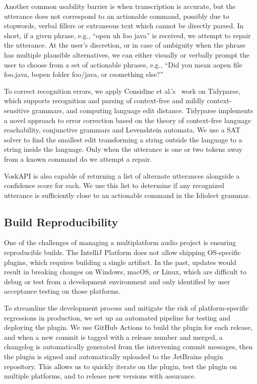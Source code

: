\documentclass[conference]{IEEEtran}
\begin{document}
Another common usability barrier is when transcription is accurate, but the utterance does not correspond to an actionable command, possibly due to stopwords, verbal fillers or extraneous text which cannot be directly parsed. In short, if a given phrase, e.g., ``open uh foo java'' is received, we attempt to repair the utterance. At the user's discretion, or in case of ambiguity when the phrase has multiple plausible alternatives, we can either visually or verbally prompt the user to choose from a set of actionable phrases, e.g., ``Did you mean \textlangle a\textrangle open file foo.java, \textlangle b\textrangle open folder foo/java, or \textlangle c\textrangle something else?''

To correct recognition errors, we apply Considine et al.'s~\cite{considine2022tidyparse} work on Tidyparse, which supports recognition and parsing of context-free and mildly context-sensitive grammars, and computing language edit distance. Tidyparse implements a novel approach to error correction based on the theory of context-free language reachability, conjunctive grammars and Levenshtein automata. We use a SAT solver to find the smallest edit transforming a string outside the language to a string inside the language. Only when the utterance is one or two tokens away from a known command do we attempt a repair.

VoskAPI is also capable of returning a list of alternate utterances alongside a confidence score for each. We use this list to determine if any recognized utterance is sufficiently close to an actionable command in the Idiolect grammar.

\subsection{Build Reproducibility}

One of the challenges of managing a multiplatform audio project is ensuring reproducible builds. The IntelliJ Platform does not allow shipping OS-specific plugins, which requires building a single artifact. In the past, updates would result in breaking changes on Windows, macOS, or Linux, which are difficult to debug or test from a development environment and only identified by user acceptance testing on those platforms.

To streamline the development process and mitigate the risk of platform-specific regressions in production, we set up an automated pipeline for testing and deploying the plugin. We use GitHub Actions to build the plugin for each release, and when a new commit is tagged with a release number and merged, a changelog is automatically generated from the intervening commit messages, then the plugin is signed and automatically uploaded to the JetBrains plugin repository. This allows us to quickly iterate on the plugin, test the plugin on multiple platforms, and to release new versions with assurance.
\end{document}
